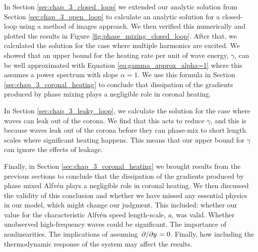 In Section \ref{sec:chap_3_closed_loop} we extended our analytic solution from Section \ref{sec:chap_3_open_loop} to calculate an analytic solution for a closed-loop using a method of images approach. We then verified this numerically and plotted the results in Figure \ref{fig:phase_mixing_closed_loop}. After that, we calculated the solution for the case where multiple harmonics are excited. We showed that an upper bound for the heating rate per unit of wave energy, $\gamma$, can be well approximated with Equation \eqref{eq:gamma_approx_alpha=1} where this assumes a power spectrum with slope $\alpha=1$. We use this formula in Section \ref{sec:chap_3_coronal_heating} to conclude that dissipation of the gradients produced by phase mixing plays a negligible role in coronal heating.

In Section \ref{sec:chap_3_leaky_loop}, we calculate the solution for the case where waves can leak out of the corona. We find that this acts to reduce $\gamma$, and this is because waves leak out of the corona before they can phase-mix to short length scales where significant heating happens. This means that our upper bound for $\gamma$ can ignore the effects of leakage.

Finally, in Section \ref{sec:chap_3_coronal_heating} we brought results from the previous sections to conclude that the dissipation of the gradients produced by phase mixed Alfv\'en plays a negligible role in coronal heating. We then discussed the validity of this conclusion and whether we have missed any essential physics in our model, which might change our judgment. This included: whether our value for the characteristic Alfv\'en speed length-scale, $a$, was valid. Whether unobserved high-frequency waves could be significant. The importance of nonlinearities. The implications of assuming $\pdv*{}{y}=0$. 
Finally, how including the thermodynamic response of the system may affect the results.

